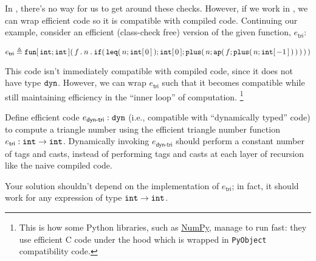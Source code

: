 \documentclass[11pt]{article}
\begin{document}
In \LangPyCF{}, there's no way for us to get around these checks.
However, if we work in \LangFPC{}, we can wrap efficient code so it is compatible with compiled \LangPyCF{} code.
Continuing our example, consider an efficient (class-check free) version of the given function, $e_\textsf{tri}$:

\[ e_\textsf{tri} \mathrel{\triangleq}{} {\mathtt{fun}}\mathtt{[}\,{\mathtt{int};\mathtt{int}}\,\mathtt{]}\mathtt{(}\,{f}\mathbin{\mathtt{.}}{{n}\mathbin{\mathtt{.}}{{\mathtt{if}}\mathtt{(}\,{\mathtt{leq}}\mathtt{(}\,n;{\mathtt{int}}\mathtt{[}\,{0}\,\mathtt{]}\,\mathtt{)};{\mathtt{int}}\mathtt{[}\,{0}\,\mathtt{]};{\mathtt{plus}}\mathtt{(}\,n;{\mathtt{ap}}\mathtt{(}\,f;{\mathtt{plus}}\mathtt{(}\,n;{\mathtt{int}}\mathtt{[}\,{-1}\,\mathtt{]}\,\mathtt{)}\,\mathtt{)}\,\mathtt{)}\,\mathtt{)}}}\,\mathtt{)} \]

This code isn't immediately compatible with compiled \LangPyCF{} code, since it does not have type $\mathtt{dyn}$.
However, we can wrap $e_\textsf{tri}$ such that it becomes compatible while still maintaining efficiency in the ``inner loop'' of computation.%
\footnote{This is how some Python libraries, such as \href{https://github.com/numpy/numpy}{NumPy}, manage to run fast: they use efficient C code under the hood which is wrapped in \lstinline[language=C]{PyObject} compatibility code.}

Define efficient code ${e_\textsf{dyn-tri}}\mathrel{:}{\mathtt{dyn}}$ (i.e., compatible with ``dynamically typed'' code) to compute a triangle number
using the efficient triangle number function ${e_\textsf{tri}}\mathrel{:}{{\mathtt{int}}\mathrel{\to}{\mathtt{int}}}$.
Dynamically invoking $e_\textsf{dyn-tri}$ should perform a constant number of tags and casts, instead of performing tags and casts at each layer of recursion like the naive compiled code.

\begin{hint}
  Your solution shouldn't depend on the implementation of $e_\textsf{tri}$; in fact, it should work for any expression of type ${\mathtt{int}}\mathrel{\to}{\mathtt{int}}$.
\end{hint}



\end{document}
